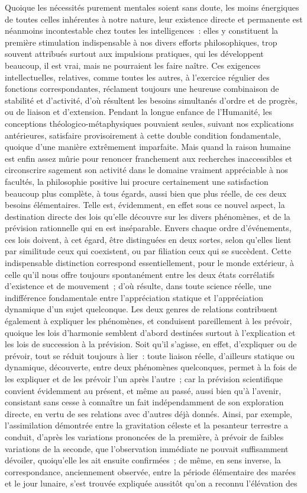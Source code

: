 \documentclass[french,twoside]{book} %
\begin{document}
Quoique les nécessités purement mentales soient sans doute, les moins énergiques de toutes celles inhérentes à notre nature, leur existence directe et permanente est néanmoins incontestable chez toutes les intelligences : elles y constituent la première stimulation indispensable à nos divers efforts philosophiques, trop souvent attribués surtout aux impulsions pratiques, qui les développent beaucoup, il est vrai, mais ne pourraient les faire naître. Ces exigences intellectuelles, relatives, comme toutes les autres, à l’exercice régulier des fonctions correspondantes, réclament toujours une heureuse combinaison de stabilité et d’activité, d’où résultent les besoins simultanés d’ordre et de progrès, ou de liaison et d’extension. Pendant la longue enfance de l’Humanité, les conceptions théologico-métaphysiques pouvaient seules, suivant nos explications antérieures, satisfaire provisoirement à cette double condition fondamentale, quoique d’une manière extrêmement imparfaite. Mais quand la raison humaine est enfin assez mûrie pour renoncer franchement aux recherches inaccessibles et circonscrire sagement son activité dans le domaine vraiment appréciable à nos facultés, la philosophie positive lui procure certainement une satisfaction beaucoup plus complète, à tous égards, aussi bien que plus réelle, de ces deux besoins élémentaires. Telle est, évidemment, en effet sous ce nouvel aspect, la destination directe des lois qu’elle découvre sur les divers phénomènes, et de la prévision rationnelle qui en est inséparable. Envers chaque ordre d’événements, ces lois doivent, à cet égard, être distinguées en deux sortes, selon qu’elles lient par similitude ceux qui coexistent, ou par filiation ceux qui se succèdent. Cette indispensable distinction correspond essentiellement, pour le monde extérieur, à celle qu’il nous offre toujours spontanément entre les deux états corrélatifs d’existence et de mouvement ; d’où résulte, dans toute science réelle, une indifférence fondamentale entre l’appréciation statique et l’appréciation dynamique d’un sujet quelconque. Les deux genres de relations contribuent également à expliquer les phénomènes, et conduisent pareillement à les prévoir, quoique les lois d’harmonie semblent d’abord destinées surtout à l’explication et les lois de succession à la prévision. Soit qu’il s’agisse, en effet, d’expliquer ou de prévoir, tout se réduit toujours à lier : toute liaison réelle, d’ailleurs statique ou dynamique, découverte, entre deux phénomènes quelconques, permet à la fois de les expliquer et de les prévoir l’un après l’autre ; car la prévision scientifique convient évidemment au présent, et même au passé, aussi bien qu’à l’avenir, consistant sans cesse à connaître un fait indépendamment de son exploration directe, en vertu de ses relations avec d’autres déjà donnés. Ainsi, par exemple, l’assimilation démontrée entre la gravitation céleste et la pesanteur terrestre a conduit, d’après les variations prononcées de la première, à prévoir de faibles variations de la seconde, que l’observation immédiate ne pouvait suffisamment dévoiler, quoiqu’elle les ait ensuite confirmées ; de même, en sens inverse, la correspondance, anciennement observée, entre la période élémentaire des marées et le jour lunaire, s’est trouvée expliquée aussitôt qu’on a reconnu l’élévation des 
\end{document}

